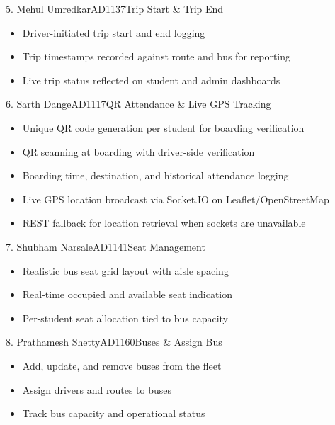\documentclass[11pt,a4paper]{report}
\begin{document}
\begin{membercard}{5. Mehul Umredkar}{AD1137}{Trip Start \& Trip End}
\begin{itemize}[leftmargin=1.2em, itemsep=1pt]
  \item Driver-initiated trip start and end logging
  \item Trip timestamps recorded against route and bus for reporting
  \item Live trip status reflected on student and admin dashboards
\end{itemize}
\end{membercard}

\begin{membercard}{6. Sarth Dange}{AD1117}{QR Attendance \& Live GPS Tracking}
\begin{itemize}[leftmargin=1.2em, itemsep=1pt]
  \item Unique QR code generation per student for boarding verification
  \item QR scanning at boarding with driver-side verification
  \item Boarding time, destination, and historical attendance logging
  \item Live GPS location broadcast via Socket.IO on Leaflet/OpenStreetMap
  \item REST fallback for location retrieval when sockets are unavailable
\end{itemize}
\end{membercard}

\begin{membercard}{7. Shubham Narsale}{AD1141}{Seat Management}
\begin{itemize}[leftmargin=1.2em, itemsep=1pt]
  \item Realistic bus seat grid layout with aisle spacing
  \item Real-time occupied and available seat indication
  \item Per-student seat allocation tied to bus capacity
\end{itemize}
\end{membercard}

\begin{membercard}{8. Prathamesh Shetty}{AD1160}{Buses \& Assign Bus}
\begin{itemize}[leftmargin=1.2em, itemsep=1pt]
  \item Add, update, and remove buses from the fleet
  \item Assign drivers and routes to buses
  \item Track bus capacity and operational status
\end{itemize}
\end{membercard}
\end{document}
